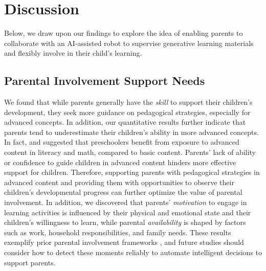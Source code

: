 \section{Discussion}
Below, we draw upon our findings to explore the idea of enabling parents to collaborate with an AI-assisted robot to supervise generative learning materials and flexibly involve in their child's learning.

\subsection{Parental Involvement Support Needs}
We found that while parents generally have the \textit{skill} to support their children's development, they seek more guidance on pedagogical strategies, especially for advanced concepts. In addition, our quantitative results further indicate that parents tend to underestimate their children's ability in more advanced concepts. In fact, \citet{claessens2014academic} and \citet{engel2013teaching} suggested that preschoolers benefit from exposure to advanced content in literacy and math, compared to basic content. Parents' lack of ability or confidence to guide children in advanced content hinders more effective support for children. Therefore, supporting parents with pedagogical strategies in advanced content and providing them with opportunities to observe their children's developmental progress can further optimize the value of parental involvement. In addition, we discovered that parents' \textit{motivation} to engage in learning activities is influenced by their physical and emotional state and their children's willingness to learn, while parental \textit{availability} is shaped by factors such as work, household responsibilities, and family needs. These results exemplify prior parental involvement frameworks \cite{green2007parents, ho2024s}, and future studies should consider how to detect these moments reliably to automate intelligent decisions to support parents.

